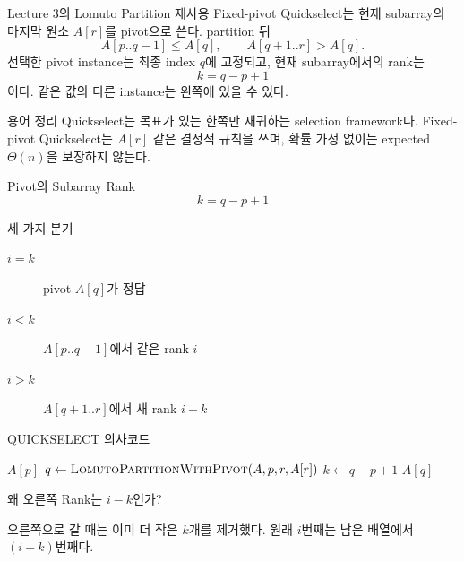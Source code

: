 \begin{frame}{Lecture 3의 Lomuto Partition 재사용}
Fixed-pivot Quickselect는 현재 subarray의 마지막 원소 $A[r]$를 pivot으로 쓴다. partition 뒤
\[A[p..q-1]\le A[q],\qquad A[q+1..r]>A[q].\]
선택한 pivot instance는 최종 index $q$에 고정되고, 현재 subarray에서의 rank는
\[
k=q-p+1
\]
이다. 같은 값의 다른 instance는 왼쪽에 있을 수 있다.
\begin{block}{용어 정리}
Quickselect는 목표가 있는 한쪽만 재귀하는 selection framework다. Fixed-pivot Quickselect는 $A[r]$ 같은 결정적 규칙을 쓰며, 확률 가정 없이는 expected $\Theta(n)$을 보장하지 않는다.
\end{block}
\end{frame}
\begin{frame}{Pivot의 Subarray Rank}
\[k=q-p+1\]
\centering{}
\end{frame}
\begin{frame}{세 가지 분기}
\begin{description}\item[$i=k$] pivot $A[q]$가 정답\item[$i<k$] $A[p..q-1]$에서 같은 rank $i$\item[$i>k$] $A[q+1..r]$에서 새 rank $i-k$\end{description}
\end{frame}
\begin{frame}{QUICKSELECT 의사코드}
\small\begin{algorithmic}[1]
\State \Return $A[p]$\EndIf
\State $q\gets\Call{LomutoPartitionWithPivot}{A,p,r,A[r]}$
\State $k\gets q-p+1$
\State \Return $A[q]$
\State \Return {}
\Else\State \Return {}\EndIf
\EndProcedure
\end{algorithmic}
\end{frame}
\begin{frame}{왜 오른쪽 Rank는 $i-k$인가?}
\centering{}
\vspace{4mm}오른쪽으로 갈 때는 이미 더 작은 $k$개를 제거했다. 원래 $i$번째는 남은 배열에서 $(i-k)$번째다.
\end{frame}

